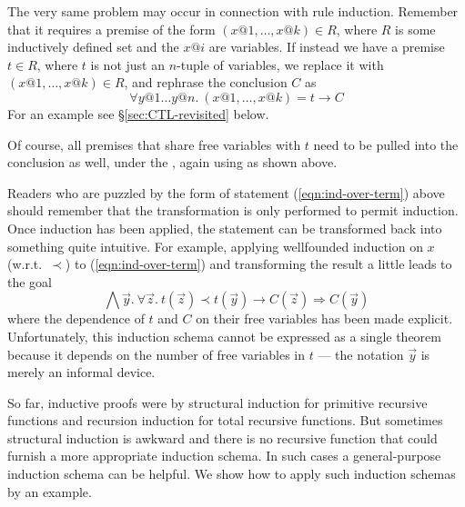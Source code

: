 \begin{isabellebody}
\begin{isamarkuptext}
The very same problem may occur in connection with rule induction. Remember
that it requires a premise of the form $(x@1,\dots,x@k) \in R$, where $R$ is
some inductively defined set and the $x@i$ are variables.  If instead we have
a premise $t \in R$, where $t$ is not just an $n$-tuple of variables, we
replace it with $(x@1,\dots,x@k) \in R$, and rephrase the conclusion $C$ as
\[ \forall y@1 \dots y@n.~ (x@1,\dots,x@k) = t \longrightarrow C \]
For an example see \S\ref{sec:CTL-revisited} below.

Of course, all premises that share free variables with $t$ need to be pulled into
the conclusion as well, under the \isa{{\isasymforall}}, again using \isa{{\isasymlongrightarrow}} as shown above.

Readers who are puzzled by the form of statement
(\ref{eqn:ind-over-term}) above should remember that the
transformation is only performed to permit induction. Once induction
has been applied, the statement can be transformed back into something quite
intuitive. For example, applying wellfounded induction on $x$ (w.r.t.\
$\prec$) to (\ref{eqn:ind-over-term}) and transforming the result a
little leads to the goal
\[ \bigwedge\vec{y}.~\forall \vec{z}.~ t(\vec{z}) \prec t(\vec{y}) \longrightarrow C(\vec{z})
   \Longrightarrow C(\vec{y}) \]
where the dependence of $t$ and $C$ on their free variables has been made explicit.
Unfortunately, this induction schema cannot be expressed as a single theorem because it depends
on the number of free variables in $t$ --- the notation $\vec{y}$ is merely an informal device.%
\end{isamarkuptext}%
%
%
\begin{isamarkuptext}%
\label{sec:complete-ind}
So far, inductive proofs were by structural induction for
primitive recursive functions and recursion induction for total recursive
functions. But sometimes structural induction is awkward and there is no
recursive function that could furnish a more appropriate
induction schema. In such cases a general-purpose induction schema can
be helpful. We show how to apply such induction schemas by an example.


\end{isamarkuptext}
\end{isabellebody}

